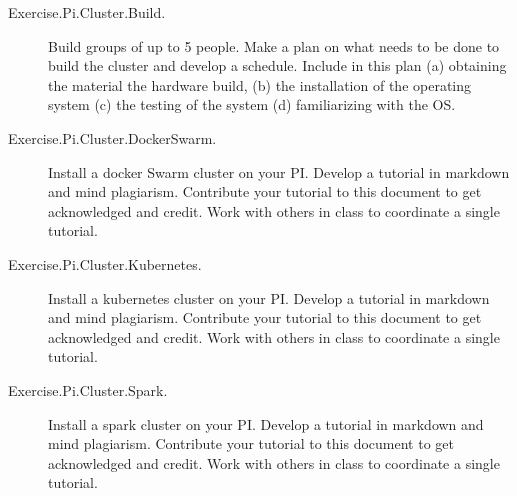 \begin{description}

\item[Exercise.Pi.Cluster.Build.] Build groups of up to 5 people. Make a
  plan on what needs to be done to build the cluster and develop a
  schedule. Include in this plan (a) obtaining the material the
  hardware build, (b) the installation of the operating system (c) the
  testing of the system (d) familiarizing with the OS.

\item[Exercise.Pi.Cluster.DockerSwarm.] Install a docker Swarm cluster on your
  PI. Develop a tutorial in markdown and mind plagiarism. Contribute your tutorial
  to this document to get acknowledged and credit. Work with others in
  class to coordinate a single tutorial.

\item[Exercise.Pi.Cluster.Kubernetes.] Install a kubernetes cluster on your
  PI. Develop a tutorial in markdown and mind plagiarism. Contribute your tutorial
  to this document to get acknowledged and credit. Work with others in
  class to coordinate a single tutorial.
  
\item[Exercise.Pi.Cluster.Spark.] Install a spark cluster on your
  PI. Develop a tutorial in markdown and mind plagiarism. Contribute your tutorial
  to this document to get acknowledged and credit. Work with others in
  class to coordinate a single tutorial.
  

\end{description}

